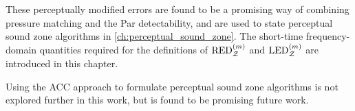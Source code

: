 These perceptually modified errors are found to be a promising way of combining pressure matching and the Par detectability,
and are used to state perceptual sound zone algorithms in \autoref{ch:perceptual_sound_zone}.
The short-time frequency-domain quantities required for the definitions of $\text{RED}^{(m)}_{\mathcal{Z}}$ and $\text{LED}^{(m)}_{\mathcal{Z}}$ are introduced in this chapter.

Using the ACC approach to formulate perceptual sound zone algorithms is not explored further in this work, but is found to be promising future work.
